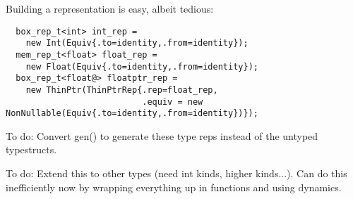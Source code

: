 Building a representation is easy, albeit tedious:

\begin{verbatim}
  box_rep_t<int> int_rep = 
    new Int(Equiv{.to=identity,.from=identity});
  mem_rep_t<float> float_rep = 
    new Float(Equiv{.to=identity,.from=identity});
  box_rep_t<float@> floatptr_rep = 
    new ThinPtr(ThinPtrRep{.rep=float_rep, 
                           .equiv = new NonNullable(Equiv{.to=identity,.from=identity})});
\end{verbatim}

To do: Convert gen() to generate these type reps instead of the untyped typestructs.


To do: Extend this to other types (need int kinds, higher kinds...).  Can do this inefficiently now by wrapping everything up in functions and using dynamics.


